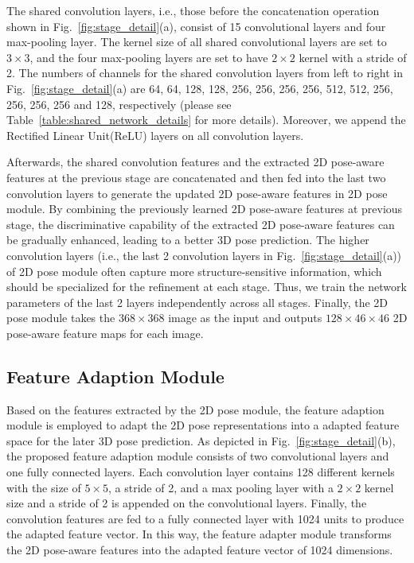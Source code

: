 \documentclass[10pt,twocolumn,letterpaper]{article}
\begin{document}
The shared convolution layers, i.e., those before the concatenation operation shown in Fig.~\ref{fig:stage_detail}(a), consist of 15 convolutional layers and four max-pooling layer. The kernel size of all shared convolutional layers are set to $3\times3$, and the four max-pooling layers are set to have $2\times2$ kernel with a stride of 2. The numbers of channels for the shared convolution layers from left to right in Fig.~\ref{fig:stage_detail}(a) are 64, 64, 128, 128, 256, 256, 256, 256, 512, 512, 256, 256, 256, 256 and 128, respectively (please see Table~\ref{table:shared_network_details} for more details). Moreover, we append the Rectified Linear Unit(ReLU) layers on all convolution layers. 

Afterwards, the shared convolution features and the extracted 2D pose-aware features at the previous stage are concatenated and then fed into the last two convolution layers to generate the updated 2D pose-aware features in 2D pose module. By combining the previously learned 2D pose-aware features at previous stage, the discriminative capability of the extracted 2D pose-aware features can be gradually enhanced, leading to a better 3D pose prediction. The higher convolution layers (i.e., the last 2 convolution layers in Fig.~\ref{fig:stage_detail}(a)) of 2D pose module often capture more structure-sensitive information, which should be specialized for the refinement at each stage. Thus, we train the network parameters of the last 2 layers independently across all stages. Finally, the 2D pose module takes the $368\times 368$ image as the input and outputs $128\times 46\times 46$ 2D pose-aware feature maps for each image.

\subsection{Feature Adaption Module}
Based on the features extracted by the 2D pose module, the feature adaption module is employed to adapt the 2D pose representations into a adapted feature space for the later 3D pose prediction. As depicted in Fig.~\ref{fig:stage_detail}(b), the proposed feature adaption module consists of two convolutional layers and one fully connected layers. Each convolution layer contains 128 different kernels with the size of $5\times5$, a stride of 2, and a max pooling layer with a $2\times2$ kernel size and a stride of 2 is appended on the convolutional layers. Finally, the convolution features are fed to a fully connected layer with 1024 units to produce the adapted feature vector. In this way, the feature adapter module transforms the 2D pose-aware features into the adapted feature vector of 1024 dimensions.
\end{document}
